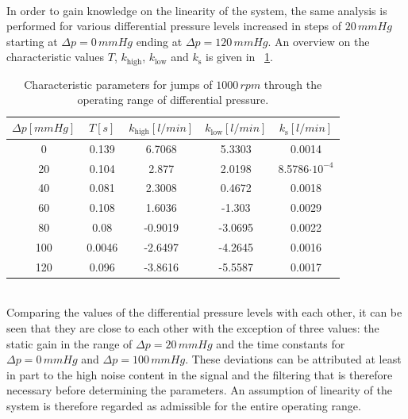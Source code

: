 \\In order to gain knowledge on the linearity of the system, the same analysis is performed for various differential pressure levels increased in steps of $20\,mmHg$ starting at $\Delta{p}=0\,mmHg$ ending at $\Delta{p}=120\,mmHg$. An overview on the characteristic values $T$, $k_{\mathrm{high}}$, $k_{\mathrm{low}}$ and $k_{\mathrm{s}}$ is given in \tablename~\ref{tab:linearity}.
\begin{table}[h]
  \centering
  \begin{tabular}{c|c|c|c|c}
    \toprule
    $\Delta{p} [mmHg]$  & $T [s]$ & $k_{\mathrm{high}} [l/min]$ & $k_{\mathrm{low}} [l/min]$ & $k_{\mathrm{s}} [l/min]$\\
    \midrule
    0 & 0.139 & 6.7068 & 5.3303 & 0.0014\\
    20 & 0.104 & 2.877 & 2.0198 & 8.5786$\cdot10^{-4}$\\
    40 &  0.081 & 2.3008 & 0.4672 & 0.0018\\
    60 & 0.108 & 1.6036 & -1.303 & 0.0029\\
    80 & 0.08 & -0.9019 & -3.0695 & 0.0022\\
    100 & 0.0046 & -2.6497 & -4.2645 & 0.0016\\
    120 & 0.096 & -3.8616 & -5.5587 & 0.0017\\
    \bottomrule
  \end{tabular}
  \caption[Characteristic parameters for jumps of $1000\,rpm$ through the operating range of differential pressure.]{Characteristic parameters for jumps of $1000\,rpm$ through the operating range of differential pressure.}
\label{tab:linearity}
\end{table}
\\Comparing the values of the differential pressure levels with each other, it can be seen that they are close to each other with the exception of three values: the static gain in the range of $\Delta{p}=20\,mmHg$ and the time constants for $\Delta{p}=0\,mmHg$ and $\Delta{p}=100\,mmHg$. These deviations can be attributed at least in part to the high noise content in the signal and the filtering that is therefore necessary before determining the parameters. An assumption of linearity of the system is therefore regarded as admissible for the entire operating range.
